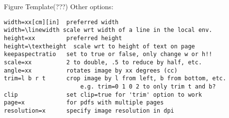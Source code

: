 \documentclass[9pt]{beamer}
\begin{document}
\begin{frame}[fragile=singleslide]{Figure Template(???)}
Other options:
    \begin{verbatim}
width=xx[cm][in]  preferred width
width=\linewidth scale wrt width of a line in the local env.
height=xx         preferred height
height=\textheight  scale wrt to height of text on page
keepaspectratio   set to true or false, only change w or h!!
scale=xx          2 to double, .5 to reduce by half, etc.
angle=xx          rotates image by xx degrees (cc)
trim=l b r t      crop image by l from left, b from bottom, etc.
                      e.g. trim=0 1 0 2 to only trim t and b?
clip              set clip=true for 'trim' option to work
page=x            for pdfs with multiple pages
resolution=x      specify image resolution in dpi
    \end{verbatim}
\end{frame}
\end{document}
